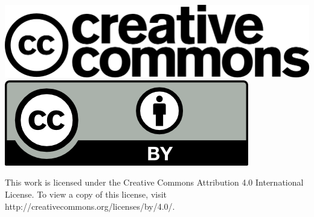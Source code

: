 \documentclass[12pt,table,xcolor={dvipsnames}]{beamer}
\begin{document}
{
\begin{frame}
\includegraphics[scale=0.8]{../reusable_images/cc_logo_arge.png}\hspace{0.5cm} 
\includegraphics[scale=0.95]{../reusable_images/by.png}

\vspace{1cm}
This work is licensed under the Creative Commons Attribution 4.0 International License. To view a copy of this license, visit http://creativecommons.org/licenses/by/4.0/.
\end{frame}
}
\end{document}
